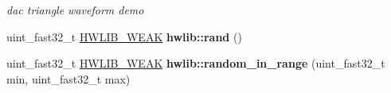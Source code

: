 \begin{DoxyCompactItemize}
\begin{DoxyCompactList}\small\item\em dac triangle waveform demo \end{DoxyCompactList}\item 
\mbox{\label{namespacehwlib_a9ff128f3303adb4ba4fa85e635580e8f}} 
uint\+\_\+fast32\+\_\+t \hyperlink{hwlib-defines_8hpp_a04be4340016df60d6636c1d1c6d94fc9}{H\+W\+L\+I\+B\+\_\+\+W\+E\+AK} {\bfseries hwlib\+::rand} ()
\item 
\mbox{\label{namespacehwlib_a37528723e1654b712db0349d6d3367a7}} 
uint\+\_\+fast32\+\_\+t \hyperlink{hwlib-defines_8hpp_a04be4340016df60d6636c1d1c6d94fc9}{H\+W\+L\+I\+B\+\_\+\+W\+E\+AK} {\bfseries hwlib\+::random\+\_\+in\+\_\+range} (uint\+\_\+fast32\+\_\+t min, uint\+\_\+fast32\+\_\+t max)
\end{DoxyCompactItemize}
